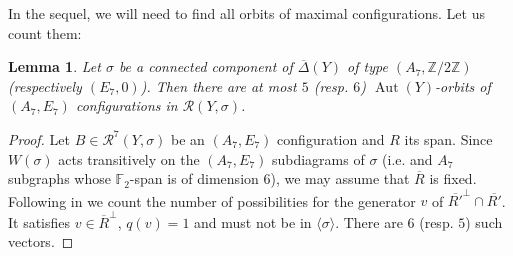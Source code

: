 \documentclass[a4paper]{amsart}
\theoremstyle{definition}
\newtheorem{remark}[definition]{Remark}
\theoremstyle{plain}
\newtheorem{lemma}[definition]{Lemma}
\DeclareMathOperator{\Aut}{Aut}
\DeclareMathOperator{\aut}{Aut^*}
\newcommand{\FF}{\mathbb{F}}
\newcommand{\ZZ}{\mathbb{Z}}
\newcommand{\R}{\mathcal{R}}
\newcommand{\DeltabarY}{\overline{\Delta}(Y)}
\begin{document}

In the sequel, we will need to find all orbits of maximal configurations. Let us count them:
\begin{lemma}\label{lem:GYorbitA7E7}
 Let $\sigma$ be a connected component of $\DeltabarY$ of type $(A_7, \ZZ/2\ZZ)$ (respectively $(E_7, 0)$).
 Then there are at most $5$ (resp. $6$) $\Aut(Y)$-orbits of $(A_7,E_7)$ configurations 
 in $\R(Y,\sigma)$. 
\end{lemma}
\begin{proof}
Let $B \in \R^7(Y,\sigma)$ be an $(A_7,E_7)$ configuration and $R$ its span.
Since $W(\sigma)$ acts transitively on the $(A_7,E_7)$ subdiagrams of $\sigma$ (i.e. and $A_7$ subgraphs whose $\FF_2$-span is of dimension $6$), we may assume that $\overline{R}$ is fixed. 
Following in  we count the number of possibilities for the generator $v$ of $\overline{R'}^\perp \cap \overline{R'}$. It satisfies $v \in \overline{R}^\perp$, $q(v)=1$ and must not be in $\langle \sigma \rangle$. There are $6$ (resp. $5$) such vectors.
\end{proof}
\end{document}
